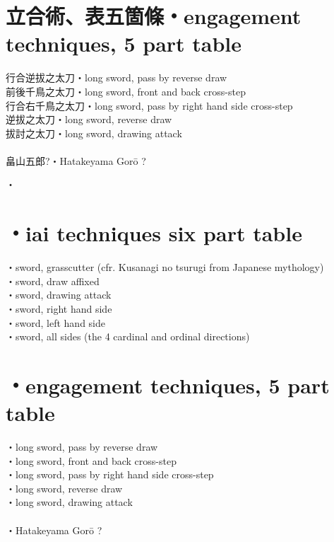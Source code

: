 \documentclass[dvipdfmx, a4paper, 12pt]{utarticle}
\begin{document}
\begin{CJK*}{UTF8}{min}
\begin{landscape}
\section{立合術、表五箇條・engagement techniques, 5 part table}
\noindent 行合逆拔之太刀・long sword, pass by reverse draw\\
前後千鳥之太刀・long sword, front and back cross-step\\
行合右千鳥之太刀・long sword, pass by right hand side cross-step\\
逆拔之太刀・long sword, reverse draw\\
拔討之太刀・long sword, drawing attack\\
\\
畠山五郎?・Hatakeyama Gor\={o} ?


\setcounter{section}{0}
\newpage
\pagestyle{empty}
・\\
\section{・iai techniques six part table}
\noindent {}・sword, grasscutter (cfr. Kusanagi no tsurugi from Japanese mythology)\\
・sword, draw affixed\\
・sword, drawing attack\\
・sword, right hand side\\
・sword, left hand side\\
・sword, all sides (the 4 cardinal and ordinal directions)\\
\section{・engagement techniques, 5 part table}
\noindent {}・long sword, pass by reverse draw\\
・long sword, front and back cross-step\\
・long sword, pass by right hand side cross-step\\
・long sword, reverse draw\\
・long sword, drawing attack\\
\\
・Hatakeyama Gor\={o} ?\\


\end{landscape}
\end{CJK*}
\end{document}
